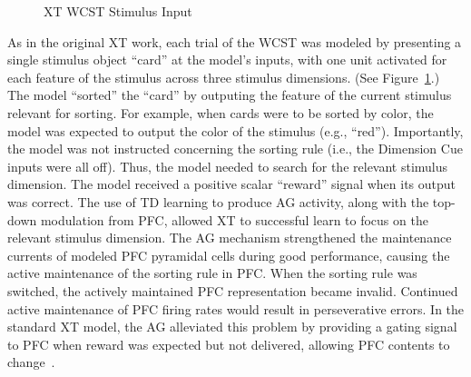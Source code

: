 \begin{figure}
  \begin{center}
  \end{center}
  \caption{XT WCST Stimulus Input}
  \label{xt_wcst_stim}
\end{figure}

As in the original XT work, each trial of the WCST was modeled by presenting a single stimulus object ``card'' at the model's inputs, with one unit activated for each feature of the stimulus across three stimulus dimensions. (See Figure~\ref{xt_wcst_stim}.) The model ``sorted'' the ``card'' by outputing the feature of the current stimulus relevant for sorting. For example, when cards were to be sorted by color, the model was expected to output the color of the stimulus (e.g., ``red''). Importantly, the model was not instructed concerning the sorting rule (i.e., the Dimension Cue inputs were all off). Thus, the model needed to search for the relevant stimulus dimension. The model received a positive scalar ``reward'' signal when its output was correct. The use of TD learning to produce AG activity, along with the top-down modulation from PFC, allowed XT to successful learn to focus on the relevant stimulus dimension. The AG mechanism strengthened the maintenance currents of modeled PFC pyramidal cells during good performance, causing the active maintenance of the sorting rule in PFC. When the sorting rule was switched, the actively maintained PFC representation became invalid. Continued active maintenance of PFC firing rates would result in perseverative errors. In the standard XT model, the AG alleviated this problem by providing a gating signal to PFC when reward was expected but not delivered, allowing PFC contents to change~\cite{RougierNP:2005:XT}.

